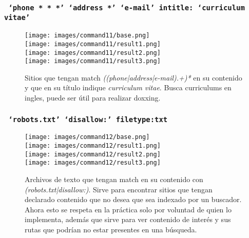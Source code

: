 \documentclass[11pt]{utalcaDoc}
\begin{document}
\subsubsection{\texttt{ \enquote*{phone * * *} \enquote*{address *} \enquote*{e-mail} intitle: \enquote*{curriculum vitae} }}
\begin{figure}[H]
	\centering
\begin{multicols}{4}
	\texttt{[image: images/command11/base.png]}\\
	\texttt{[image: images/command11/result1.png]}\\
	\texttt{[image: images/command11/result2.png]}\\
	\texttt{[image: images/command11/result3.png]}\\
\end{multicols}
\caption{Sitios que tengan match \textit{((phone|address|e-mail).+)*} en su contenido y que en su título indique \textit{curriculum vitae}. Busca curriculums en ingles, puede ser útil para realizar doxxing.}
\label{FIG:command11}
\end{figure}


\subsubsection{\texttt{ \enquote*{robots.txt} \enquote*{disallow:} filetype:txt}}
\begin{figure}[H]
	\centering
\begin{multicols}{4}
	\texttt{[image: images/command12/base.png]}\\
	\texttt{[image: images/command12/result1.png]}\\
	\texttt{[image: images/command12/result2.png]}\\
	\texttt{[image: images/command12/result3.png]}\\
\end{multicols}
\caption{Archivos de texto que tengan match en su contenido con \textit{(robots.txt|disallow:)}. Sirve para encontrar sitios que tengan declarado contenido que no desea que sea indexado por un buscador. Ahora esto se respeta en la práctica solo por voluntad de quien lo implementa, además que sirve para ver contenido de interés y sus rutas que podrían no estar presentes en una búsqueda.}
\label{FIG:command12}
\end{figure}
\end{document}
